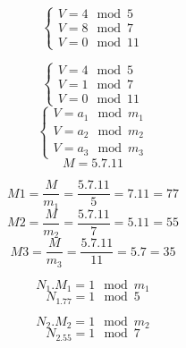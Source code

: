 \documentclass[12pt]{article}
\begin{document}
    \begin{equation}
        \begin{cases}
            V = 4 \mod 5 \\
            V = 8 \mod 7 \\
            V = 0 \mod 11
        \end{cases}
    \end{equation}
    
    \begin{equation}
        \begin{cases}
            V = 4 \mod 5 \\
            V = 1 \mod 7 \\
            V = 0 \mod 11
        \end{cases}
    \end{equation}
    \begin{equation}
        \begin{cases}
            V = a_1 \mod m_1 \\
            V = a_2 \mod m_2 \\
            V = a_3 \mod m_3
        \end{cases}
    \end{equation}
    \begin{equation}
        M = 5.7.11
    \end{equation}
    
    \begin{equation}
        M1 = \frac{M}{m_1} = \frac{5.7.11}{5} = 7.11 = 77
    \end{equation}
    \begin{equation}
        M2 = \frac{M}{m_2} = \frac{5.7.11}{7} = 5.11 = 55
    \end{equation}
    \begin{equation}
        M3 = \frac{M}{m_3} = \frac{5.7.11}{11} = 5.7 = 35
    \end{equation}
    
    \begin{equation}
        N_1.M_1 = 1 \mod m_1
    \end{equation}
    \begin{equation}
        N_1.77 = 1 \mod 5
    \end{equation}
    
    \begin{equation}
        N_2.M_2 = 1 \mod m_2
    \end{equation}
    \begin{equation}
        N_2.55 = 1 \mod 7
    \end{equation}
    
\end{document}
